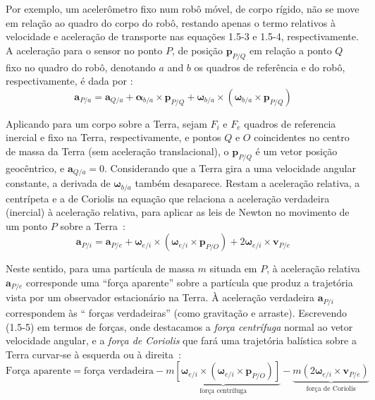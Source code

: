 Por exemplo, um acelerômetro fixo num robô móvel, de corpo rígido, não se move em relação ao quadro do corpo do robô, restando apenas o termo relativos à velocidade e aceleração de transporte nas equações 1.5-3 e 1.5-4, respectivamente. A aceleração para o sensor no ponto \(P\), de posição \(\mathbf{p}_{P/Q}\) em relação a ponto \(Q\) fixo no quadro do robô, denotando \(a\) and \(b\) os quadros de referência e do robô, respectivamente, é dada por \cite{Stevens2016}:
\begin{equation*}
    {\mathbf{a}_{P/a}} = {\mathbf{a}_{Q/a}} + {\mathbf{\alpha}_{b/a}}\!\times\!{\mathbf{p}_{P/Q}} + {\mathbf{\omega}_{b/a}}\!\times\!\left({\mathbf{\omega}_{b/a}}\!\times\!{\mathbf{p}_{P/Q}}\right)
\end{equation*}

Aplicando para um corpo sobre a Terra, sejam \(F_{i}\)  e  \(F_{e}\) quadros de referencia inercial e fixo na Terra, respectivamente, e pontos \(Q\) e \(O\) coincidentes no centro de massa da Terra (sem aceleração translacional), o \(\mathbf{p}_{P/Q}\) é um vetor posição geocêntrico, e \(\mathbf{a}_{Q/a}=0\). Considerando que a Terra gira a uma velocidade angular constante, a derivada de \(\mathbf{\omega}_{b/a}\) também desaparece. Restam a aceleração relativa, a centrípeta e a de Coriolis na equação que relaciona a aceleração verdadeira (inercial) à aceleração relativa, para aplicar as leis de Newton no movimento de um ponto \(P\) sobre a Terra~\cite{Stevens2016}:
\begin{equation*} \tag{1.5-5}
    {\mathbf{a}_{P/i}} = {\mathbf{a}_{P/e}} + {\mathbf{\omega}_{e/i}}\!\times\!\left({\mathbf{\omega}_{e/i}}\!\times\!{\mathbf{p}_{P/O}}\right) + 2\mathbf{\omega}_{e/i}\!\times\!\mathbf{v}_{P/e}
\end{equation*}

Neste sentido, para uma partícula de massa \(m\) situada em \(P\), à aceleração relativa \(\mathbf{a}_{P/e}\) corresponde uma ``força aparente'' sobre a partícula que produz a trajetória vista por um observador estacionário na Terra. À aceleração verdadeira \(\mathbf{a}_{P/i}\) correspondem às `` forças verdadeiras'' (como gravitação e arraste).  Escrevendo (1.5-5) em termos de forças, onde destacamos a \textit{força centrífuga} normal ao vetor velocidade angular, e a \textit{força de Coriolis}\footnotemark{} que fará uma trajetória balística sobre a Terra curvar-se à esquerda ou à direita~\cite{Stevens2016}:
\begin{equation*}
    \text{Força aparente} = \text{força verdadeira} - \underbrace{m \left[{\mathbf{\omega}_{e/i}}\!\times\!\left({\mathbf{\omega}_{e/i}}\!\times\!{\mathbf{p}_{P/O}}\right)\right]}_{\text{força centrífuga}} - \underbrace{m \left( 2{\mathbf{\omega}_{e/i}}\!\times\!{\mathbf{v}_{P/e}}\right)}_{\text{força de Coriolis}}
\end{equation*}

